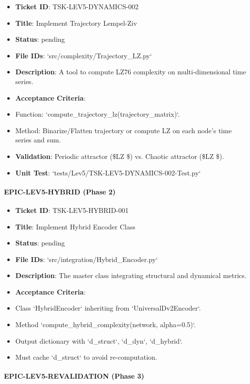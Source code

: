 \documentclass{article}
\begin{document}
\begin{itemize}
\item   \textbf{Ticket ID}: TSK-LEV5-DYNAMICS-002
\item   \textbf{Title}: Implement Trajectory Lempel-Ziv
\item   \textbf{Status}: pending
\item   \textbf{File IDs}: `src/complexity/Trajectory\_LZ.py`
\item   \textbf{Description}: A tool to compute LZ76 complexity on multi-dimensional time series.
\item   \textbf{Acceptance Criteria}:
\item   Function: `compute\_trajectory\_lz(trajectory\_matrix)`.
\item   Method: Binarize/Flatten trajectory or compute LZ on each node's time series and sum.
\item   \textbf{Validation}: Periodic attractor (\$LZ \$) vs. Chaotic attractor (\$LZ \$).
\item   \textbf{Unit Test}: `tests/Lev5/TSK-LEV5-DYNAMICS-002-Test.py`
\end{itemize}

\paragraph{EPIC-LEV5-HYBRID (Phase 2)}

\begin{itemize}
\item   \textbf{Ticket ID}: TSK-LEV5-HYBRID-001
\item   \textbf{Title}: Implement Hybrid Encoder Class
\item   \textbf{Status}: pending
\item   \textbf{File IDs}: `src/integration/Hybrid\_Encoder.py`
\item   \textbf{Description}: The master class integrating structural and dynamical metrics.
\item   \textbf{Acceptance Criteria}:
\item   Class `HybridEncoder` inheriting from `UniversalDv2Encoder`.
\item   Method `compute\_hybrid\_complexity(network, alpha=0.5)`.
\item   Output dictionary with `d\_struct`, `d\_dyn`, `d\_hybrid`.
\item   Must cache `d\_struct` to avoid re-computation.
\end{itemize}

\paragraph{EPIC-LEV5-REVALIDATION (Phase 3)}
\end{document}

